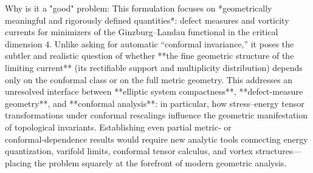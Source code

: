 Why is it a "good" problem:  
This formulation focuses on *geometrically meaningful and rigorously defined quantities*: defect measures and vorticity currents for minimizers of the Ginzburg–Landau functional in the critical dimension 4.  
Unlike asking for automatic “conformal invariance,” it poses the subtler and realistic question of whether **the fine geometric structure of the limiting current** (its rectifiable support and multiplicity distribution) depends only on the conformal class or on the full metric geometry.  
This addresses an unresolved interface between **elliptic system compactness**, **defect‑measure geometry**, and **conformal analysis**: in particular, how stress–energy tensor transformations under conformal rescalings influence the geometric manifestation of topological invariants.  
Establishing even partial metric‑ or conformal‑dependence results would require new analytic tools connecting energy quantization, varifold limits, conformal tensor calculus, and vortex structures—placing the problem squarely at the forefront of modern geometric analysis.